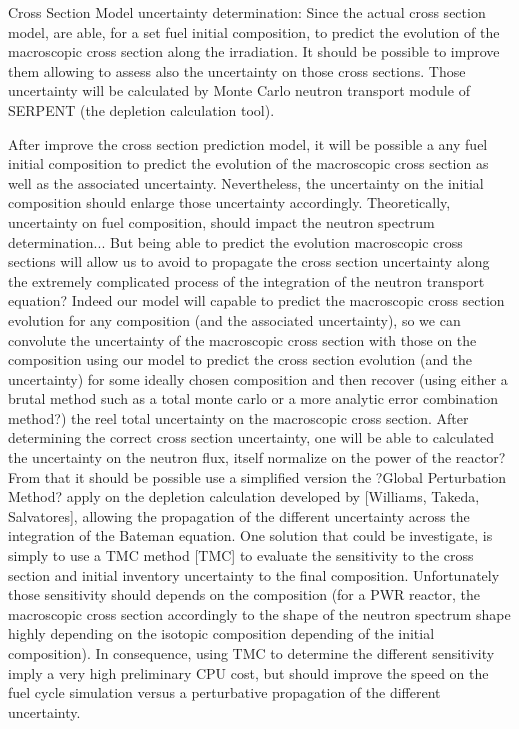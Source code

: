 \documentclass[dvips,12pt]{article}
\begin{document}
Cross Section Model uncertainty determination:
Since the actual cross section model, are able, for a set fuel initial composition, to predict the evolution of the macroscopic cross section along the irradiation. It should be possible to improve them allowing to assess also the uncertainty on those cross sections. Those uncertainty will be calculated by Monte Carlo neutron transport module of SERPENT (the depletion calculation tool). 

After improve the cross section prediction model, it will be possible a any fuel initial composition to predict the evolution of the macroscopic cross section as well as the associated uncertainty.
Nevertheless, the uncertainty on the initial composition should enlarge those uncertainty accordingly. Theoretically, uncertainty on fuel composition, should impact the neutron spectrum determination... But being able to predict the evolution macroscopic cross sections will allow us to avoid to propagate the cross section uncertainty along the extremely complicated process of the integration of the neutron transport equation? Indeed our model will capable to predict the macroscopic cross section evolution for any composition (and the associated uncertainty), so we can convolute the uncertainty of the macroscopic cross section with those on the composition using our model to predict the cross section evolution (and the uncertainty) for some ideally chosen composition and then recover  (using either a brutal method such as a total monte carlo or a more analytic error combination method?) the reel total uncertainty on the macroscopic cross section.
After determining the correct cross section uncertainty, one will be able to calculated the uncertainty on the neutron flux, itself normalize on the power of the reactor?
From that it should be possible use a simplified version the ?Global Perturbation Method? apply on the depletion calculation developed by [Williams, Takeda, Salvatores], allowing the propagation of the different uncertainty across the integration of the Bateman equation.
One solution that could be investigate, is simply to use a TMC method [TMC] to evaluate the sensitivity to the cross section and initial inventory uncertainty to the final composition. Unfortunately those sensitivity should depends on the composition (for a PWR reactor, the macroscopic cross section accordingly to the shape of the neutron spectrum shape highly depending on the isotopic composition depending of the initial composition). In consequence, using TMC to determine the different sensitivity imply a very high preliminary CPU cost, but should improve the speed on the fuel cycle simulation versus a perturbative propagation of the different uncertainty.
  
\end{document}
